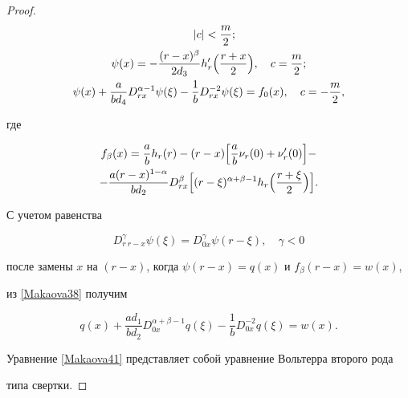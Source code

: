 \begin{proof}
\begin{gather}
\quad  |c|<\frac{m}{2};

\\

\label{Makaova39} 

\psi(x)=-\frac{(r-x)^\beta}{2d_3} h_r'\Bigl( \frac{r+x}{2} \Bigr), \quad  c=\frac{m}{2};

\\

\label{Makaova40} 

\psi(x)+\frac{a}{bd_4}D^{\alpha-1}_{rx}\psi(\xi)-\frac{1}{b}D^{-2}_{rx}\psi(\xi)=f_0(x), \quad   c=-\frac{m}{2},

 \end{gather}

где 

\begin{multline*}

f_\beta(x)=\frac{a}{b}h_r(r)-(r-x)

\Bigl[\frac{a}{b} \nu_r(0)+\nu_r'(0)\Bigr]-

\\

-\frac{a(r-x)^{1-\alpha}}{bd_2}D^\beta_{rx} 

\Bigl[

(r-\xi)^{\alpha+\beta-1} h_r\Bigl( \frac{r+\xi}{2} \Bigr)

\Bigr].

\end{multline*}



С учетом равенства

 \[

D^\gamma_{r \ r-x}\psi(\xi)=

D^\gamma_{0 x}\psi(r-\xi), \quad  \gamma<0

\]

после замены $x$   на  $(r-x)$, когда $\psi(r-x)=q(x)$ и   $f_\beta(r-x)=w(x)$,

 из  \eqref{Makaova38} получим

  \begin{equation}

\label{Makaova41} 

q(x)+\frac{ad_1}{bd_2}D^{\alpha+\beta-1}_{0x}q(\xi)-\frac{1}{b}D^{-2}_{0x}q(\xi)=w(x).

 \end{equation} 



Уравнение \eqref{Makaova41} представляет собой уравнение Вольтерра второго рода

типа свертки. 


\end{proof}
